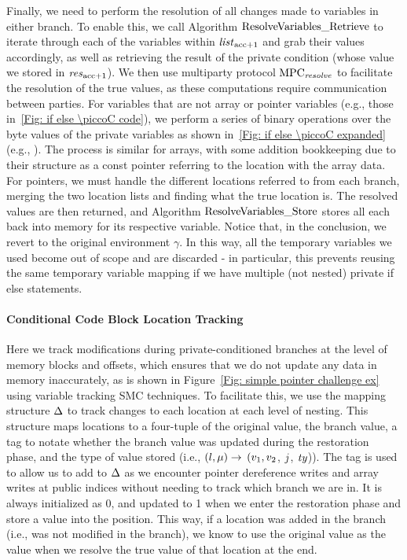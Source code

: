  
Finally, we need to perform the resolution of all changes made to variables in either branch. 
To enable this, we call Algorithm $\mathrm{ResolveVariables\_Retrieve}$ to iterate through each of the variables within $\mathit{list}_{\mathrm{acc}+1}$ and grab their values accordingly, as well as retrieving the result of the private condition (whose value we stored in $\mathit{res}_{\mathrm{acc}+1}$). 
We then use multiparty protocol $\mathrm{MPC}_\mathit{{resolve}}$ to facilitate the resolution of the true values, as these computations require communication between parties. 
For variables that are not array or pointer variables (e.g., those in~\ref{Fig: if else \piccoC code}), we perform a series of binary operations over the byte values of the private variables as shown in~\ref{Fig: if else \piccoC expanded} (e.g., ). 
The process is similar for arrays, with some addition bookkeeping due to their structure as a const pointer referring to the location with the array data. 
For pointers, we must handle the different locations referred to from each branch, merging the two location lists and finding what the true location is. 
The resolved values are then returned, and Algorithm $\mathrm{ResolveVariables\_Store}$ stores all each back into memory for its respective variable. 
Notice that, in the conclusion, we revert to the original environment $\gamma$. In this way, all the temporary variables we used become out of scope and are discarded - in particular, this prevents reusing the same temporary variable mapping if we have multiple (not nested) private if else statements.




\paragraph{Conditional Code Block Location Tracking}
\label{sec: priv if lt desc}
Here we track modifications during private-conditioned branches at the level of memory blocks and offsets, which ensures that we do not update any data in memory inaccurately, as is shown in Figure~\ref{Fig: simple pointer challenge ex} using variable tracking SMC techniques.  
To facilitate this, we use the mapping structure $\Delta$ to track changes to each location at each level of nesting. This structure maps locations to a four-tuple of the original value, the  branch value, a tag to notate whether the  branch value was updated during the restoration phase, and the type of value stored (i.e., $(l, \mu) \to$ $(v_1, v_2$, $j$, $\mathit{ty}$)). The tag is used to allow us to add to $\Delta$ as we encounter pointer dereference writes and array writes at public indices without needing to track which branch we are in. It is always initialized as 0, and updated to 1 when we enter the restoration phase and store a value into the  position. This way, if a location was added in the  branch (i.e., was not modified in the  branch), we know to use the original value as the  value when we resolve the true value of that location at the end. 

